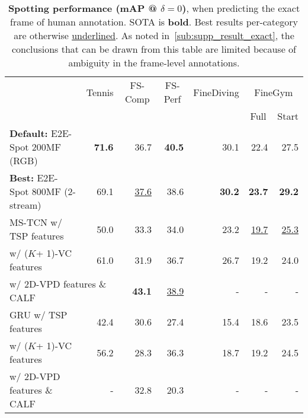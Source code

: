 \documentclass[runningheads]{llncs}
\newcommand{\notation}[1]{\ensuremath{#1}\xspace}
\newcommand{\OURMETHOD}{{E2E-Spot}\xspace}
\newcommand{\fscomp}{{FS-Comp}\xspace}
\newcommand{\fsperf}{{FS-Perf}\xspace}
\newcommand{\tennis}{{Tennis}\xspace}
\newcommand{\finegym}{{FineGym}\xspace}
\newcommand{\finediving}{{FineDiving}\xspace}
\newcommand{\NumClasses}{\notation{K}}
\newcommand{\Tolerance}{\notation{\delta}}
\newcommand{\best}[1]{\underline{#1}}
\newcommand{\sota}[1]{\textbf{#1}}
\begin{document}
\renewcommand{\tabcolsep}{0.12cm}
\begin{table*}[p]
    \centering
    \caption{{\bf Spotting performance (mAP @ $\Tolerance=0$)}, when predicting the exact frame of human annotation.
SOTA is \sota{bold}. Best results per-category are otherwise \best{underlined}.
As noted in~\autoref{sub:supp_result_exact}, the conclusions that can be drawn from this table are limited because of ambiguity in the frame-level annotations. }
    \label{tab:supp_result_exact}
    {
    \scriptsize
    \begin{tabularx}{\textwidth}{lrrrrrr}
        \toprule
            & \multicolumn{1}{c}{\tennis}
            & \multicolumn{1}{c}{\fscomp}
            & \multicolumn{1}{c}{\fsperf}
            & \multicolumn{1}{c}{\finediving}
            & \multicolumn{2}{c}{\finegym}
            \\
            &
            &
            &
            &
            & \multicolumn{1}{c}{Full}
            & \multicolumn{1}{c}{Start}
            \\
        \midrule
        {\bf Default:} \OURMETHOD 200MF (RGB)
            & \sota{71.6}
            & 36.7
            & \sota{40.5}
            & 30.1
            & 22.4 & 27.5 \\
        {\bf Best:} \OURMETHOD 800MF (2-stream)
            & 69.1
            & \best{37.6}
            & 38.6
            & \sota{30.2}
            & \sota{23.7} & \sota{29.2} \\
        \midrule
        MS-TCN w/ TSP features
            & 50.0
            & 33.3
            & 34.0
            & 23.2
            & \best{19.7} & \best{25.3}\\
        \hspace{4em} w/ (\NumClasses + 1)-VC features
            & 61.0
            & 31.9
            & 36.7
            & 26.7
            & 19.2 & 24.0 \\
        \multicolumn{2}{l}{\hspace{4em} w/ 2D-VPD features \& CALF}
            - & \sota{43.1} & \best{38.9} & - & - & - \\

        GRU w/ TSP features
            & 42.4
            & 30.6
            & 27.4
            & 15.4
            & 18.6 & 23.5 \\
        \hspace{2.2em} w/ (\NumClasses + 1)-VC features
            & 56.2
            & 28.3
            & 36.3
            & 18.7
            & 19.2 & 24.5 \\
        \hspace{2.2em} w/ 2D-VPD features \& CALF
            & - & 32.8 & 20.3 & - & - & - \\


\end{tabularx}}
\end{table*}
\end{document}
